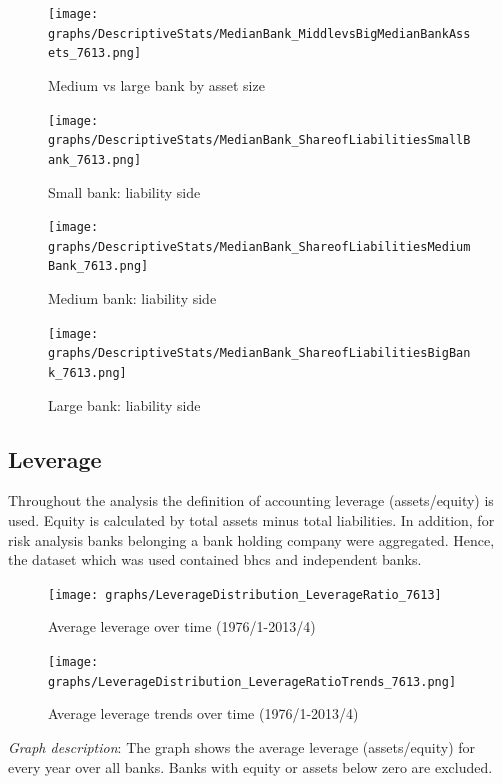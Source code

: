 \documentclass[12pt, a4paper]{article} %
\begin{document}
\begin{figure}[hbtp]
\centering
\caption{Medium vs large bank by asset size}
\texttt{[image: graphs/DescriptiveStats/MedianBank\_MiddlevsBigMedianBankAssets\_7613.png]}
\end{figure}


\begin{figure}[hbtp]
\centering
\caption{Small bank: liability side}
\texttt{[image: graphs/DescriptiveStats/MedianBank\_ShareofLiabilitiesSmallBank\_7613.png]}
\end{figure}


\begin{figure}[hbtp]
\centering
\caption{Medium bank: liability side}
\texttt{[image: graphs/DescriptiveStats/MedianBank\_ShareofLiabilitiesMediumBank\_7613.png]}
\end{figure}


\begin{figure}[hbtp]
\centering
\caption{Large bank: liability side}
\texttt{[image: graphs/DescriptiveStats/MedianBank\_ShareofLiabilitiesBigBank\_7613.png]}
\end{figure}



\newpage

\subsection{Leverage}

Throughout the analysis the definition of accounting leverage (assets/equity) is used. Equity is calculated by total assets minus total liabilities. In addition, for risk analysis banks belonging a bank holding company were aggregated. Hence, the dataset which was used contained bhcs and independent banks.

\begin{figure}[hbtp]
\centering
\caption{Average leverage over time (1976/1-2013/4)}
\texttt{[image: graphs/LeverageDistribution\_LeverageRatio\_7613]}
\end{figure}

\begin{figure}[hbtp]
\centering
\caption{Average leverage trends over time (1976/1-2013/4)}
\texttt{[image: graphs/LeverageDistribution\_LeverageRatioTrends\_7613.png]}
\end{figure}

\noindent \textit{Graph description}: The graph shows the average leverage (assets/equity) for every year over all banks. Banks with equity or assets below zero are excluded.
\end{document}
